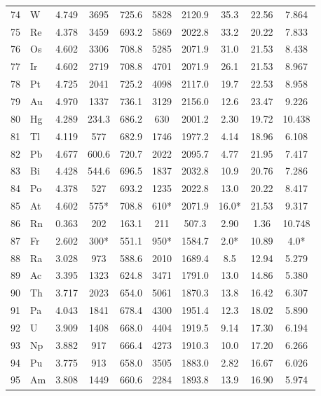 \documentclass[11pt,a4paper]{article}
\begin{document}
\begin{english}
\begin{longtable}{@{}llcccccccc@{}}
			74 & W   & 4.749 & 3695   & 725.6  & 5828   & 2120.9 & 35.3  & 22.56 & 7.864 \\
			75 & Re  & 4.378 & 3459   & 693.2  & 5869   & 2022.8 & 33.2  & 20.22 & 7.833 \\
			76 & Os  & 4.602 & 3306   & 708.8  & 5285   & 2071.9 & 31.0  & 21.53 & 8.438 \\
			77 & Ir  & 4.602 & 2719   & 708.8  & 4701   & 2071.9 & 26.1  & 21.53 & 8.967 \\
			78 & Pt  & 4.725 & 2041   & 725.2  & 4098   & 2117.0 & 19.7  & 22.53 & 8.958 \\
			79 & Au  & 4.970 & 1337   & 736.1  & 3129   & 2156.0 & 12.6  & 23.47 & 9.226 \\
			80 & Hg  & 4.289 & 234.3  & 686.2  & 630    & 2001.2 & 2.30  & 19.72 & 10.438 \\
			81 & Tl  & 4.119 & 577    & 682.9  & 1746   & 1977.2 & 4.14  & 18.96 & 6.108 \\
			82 & Pb  & 4.677 & 600.6  & 720.7  & 2022   & 2095.7 & 4.77  & 21.95 & 7.417 \\
			83 & Bi  & 4.428 & 544.6  & 696.5  & 1837   & 2032.8 & 10.9  & 20.76 & 7.286 \\
			84 & Po  & 4.378 & 527    & 693.2  & 1235   & 2022.8 & 13.0  & 20.22 & 8.417 \\
			85 & At  & 4.602 & 575*   & 708.8  & 610*   & 2071.9 & 16.0* & 21.53 & 9.317 \\
			86 & Rn  & 0.363 & 202    & 163.1  & 211    & 507.3  & 2.90  & 1.36  & 10.748 \\
			87 & Fr  & 2.602 & 300*   & 551.1  & 950*   & 1584.7 & 2.0*  & 10.89 & 4.0* \\
			88 & Ra  & 3.028 & 973    & 588.6  & 2010   & 1689.4 & 8.5   & 12.94 & 5.279 \\
			89 & Ac  & 3.395 & 1323   & 624.8  & 3471   & 1791.0 & 13.0  & 14.86 & 5.380 \\
			90 & Th  & 3.717 & 2023   & 654.0  & 5061   & 1870.3 & 13.8  & 16.42 & 6.307 \\
			91 & Pa  & 4.043 & 1841   & 678.4  & 4300   & 1951.4 & 12.3  & 18.02 & 5.890 \\
			92 & U   & 3.909 & 1408   & 668.0  & 4404   & 1919.5 & 9.14  & 17.30 & 6.194 \\
			93 & Np  & 3.882 & 917    & 666.4  & 4273   & 1910.3 & 10.0  & 17.20 & 6.266 \\
			94 & Pu  & 3.775 & 913    & 658.0  & 3505   & 1883.0 & 2.82  & 16.67 & 6.026 \\
			95 & Am  & 3.808 & 1449   & 660.6  & 2284   & 1893.8 & 13.9  & 16.90 & 5.974 \\

\end{longtable}
\end{english}
\end{document}
